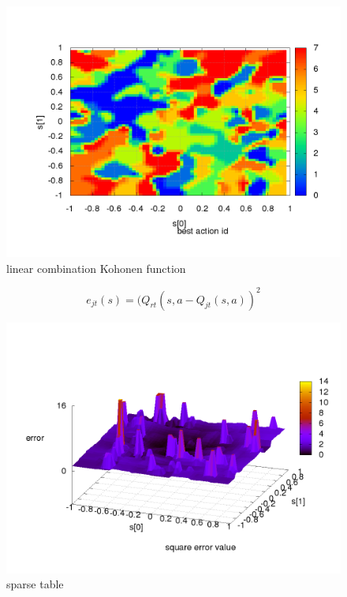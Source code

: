 \begin{figure}
\includegraphics[scale=.21]{../../results_q_learning/map_1/function_type_4/iterations_10/action_best_value_log_surface.png}
\caption{linear combination Kohonen function}
\end{figure}




\begin{equation}
e_{jt}(s) = (Q_{rt}(s,a - Q_{jt}(s,a))^2  \nonumber
\end{equation}


\begin{figure}[!htb]
\centering
\includegraphics[scale=.2]{../../results_q_learning/map_1/function_type_1/q_learning_error.png}
\caption{sparse table}
\end{figure}


